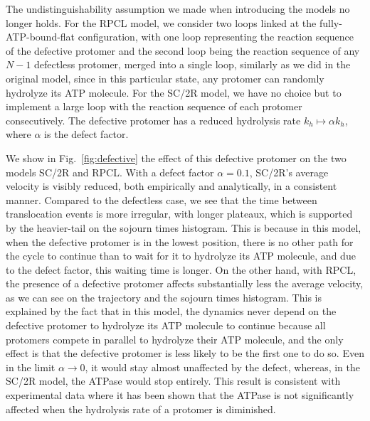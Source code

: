     The undistinguishability assumption we made when introducing the models no longer holds. For the RPCL model, we consider two loops linked at the fully-ATP-bound-flat configuration, with one loop representing the reaction sequence of the defective protomer and the second loop being the reaction sequence of any $N-1$ defectless protomer, merged into a single loop, similarly as we did in the original model, since in this particular state, any protomer can randomly hydrolyze its ATP molecule. For the SC/2R model, we have no choice but to implement a large loop with the reaction sequence of each protomer consecutively. The defective protomer has a reduced hydrolysis rate $k_h\mapsto \alpha k_h$, where $\alpha$ is the defect factor.

    We show in Fig.~\ref{fig:defective} the effect of this defective protomer on the two models SC/2R and RPCL. With a defect factor $\alpha = 0.1$, SC/2R's average velocity is visibly reduced, both empirically and analytically, in a consistent manner. Compared to the defectless case, we see that the time between translocation events is more irregular, with longer plateaux, which is supported by the heavier-tail on the sojourn times histogram. This is because in this model, when the defective protomer is in the lowest position, there is no other path for the cycle to continue than to wait for it to hydrolyze its ATP molecule, and due to the defect factor, this waiting time is longer. On the other hand, with RPCL, the presence of a defective protomer affects substantially less the average velocity, as we can see on the trajectory and the sojourn times histogram. This is explained by the fact that in this model, the dynamics never depend on the defective protomer to hydrolyze its ATP molecule to continue because all protomers compete in parallel to hydrolyze their ATP molecule, and the only effect is that the defective protomer is less likely to be the first one to do so. Even in the limit $\alpha\rightarrow 0$, it would stay almost unaffected by the defect, whereas, in the SC/2R model, the ATPase would stop entirely. This result is consistent with experimental data where it has been shown that the ATPase is not significantly affected when the hydrolysis rate of a protomer is diminished\cite{desantis_operational_2012}.

